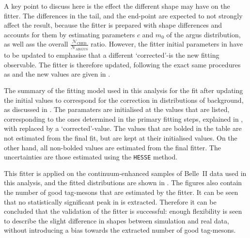 A key point to discuss here is the effect the different \Mbc shape may have on the \Mbc fitter.
The differences in the tail, and the end-point are expected to not strongly affect the result, because the \Mbc fitter is prepared with shape differences and accounts for them
by estimating parameters $c$ and $m_0$ of the argus distribution, as well ass the overall $\frac{\mathcal{N}_{\mathrm{CHEB}}}{\mathcal{N}_{\mathrm{ARGUS}}}$ ratio.
However, the \Mbc fitter initial parameters in  have to be updated to emphasise that a different `corrected'-\Mbc is the new fitting observable.
The \Mbc fitter is therefore updated, following the exact same procedures as  and the new values are given in .
\begin{table}[htbp!]
    \centering
    \caption{\label{tab:fitting_init_params_updated} The summary of the fitting model used in this analysis for the \Mbc fit after updating the initial values to correspond for the correction in \Mbc distributions of background, as discussed in .
    The paramaters are initialised at the values that are listed, corresponding to the ones determined in the primary fitting steps, explained in , with \Mbc replaced by a `corrected'-\Mbc value.
    The values that are bolded in the table are not estimated from the final \Mbc fit, but are kept at their initialised values.
    On the other hand, all non-bolded values are estimated from the final fitter.
    The uncertainties are those estimated using the \texttt{HESSE} method.
    }

\end{table}

This fitter is applied on the continuum-enhanced samples of Belle~II data used in this analysis,
and the  fitted \Mbc distributions are shown in .
The figures also contain the number of good tag-\B mesons that are estimated by the fitter.
It can be seen that no statistically significant peak in \Mbc is extracted.
Therefore it can be concluded that the validation of the \Mbc fitter is successful: enough flexibility is seen
to describe the slight difference in \Mbc shapes between simulation and real data, without introducing a bias towards the extracted number of good tag-\B mesons.


